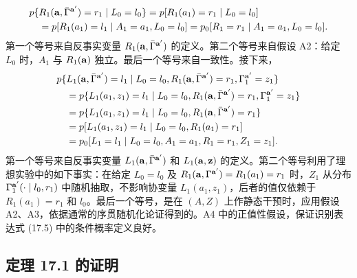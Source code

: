 \[
\begin{aligned}
&p\{R_1(\mathbf a,\bar\Gamma^{\mathbf a'})=r_1\mid L_0=l_0\}
 =p[R_1(a_1)=r_1\mid L_0=l_0]\\
&\quad=p[R_1(a_1)=l_1\mid A_1=a_1,L_0=l_0]
 =p_0[R_1=r_1\mid A_1=a_1,L_0=l_0].
\end{aligned}
\]
第一个等号来自反事实变量 $R_1(\mathbf a,\bar\Gamma^{\mathbf a'})$ 的定义。第二个等号来自假设 A2：给定 $L_0$ 时，$A_1$ 与 $R_1(\mathbf a)$ 独立。最后一个等号来自一致性。接下来，
\[
\begin{aligned}
&p\{L_1(\mathbf a,\bar\Gamma^{\mathbf a'})=l_1\mid
 L_0=l_0,R_1(\mathbf a,\bar\Gamma^{\mathbf a'})=r_1,\Gamma_1^{\mathbf a'}=z_1\}\\
&\quad=p\{L_1(a_1,z_1)=l_1\mid
 L_0=l_0,R_1(\mathbf a,\bar\Gamma^{\mathbf a'})=r_1,\Gamma_1^{\mathbf a'}=z_1\}\\
&\quad=p\{L_1(a_1,z_1)=l_1\mid L_0=l_0,R_1(\mathbf a,\bar\Gamma^{\mathbf a'})=r_1\}\\
&\quad=p[L_1(a_1,z_1)=l_1\mid L_0=l_0,R_1(a_1)=r_1]\\
&\quad=p_0[L_1=l_1\mid L_0=l_0,A_1=a_1,R_1=r_1,Z_1=z_1].
\end{aligned}
\]
第一个等号来自反事实变量 $L_1(\mathbf a,\bar\Gamma^{\mathbf a'})$ 和 $L_1(\mathbf a,\mathbf z)$ 的定义。第二个等号利用了理想实验中的如下事实：在给定 $L_0=l_0$ 及 $R_1(\mathbf a,\Gamma^{\mathbf a'})=R_1(a_1)=r_1$ 时，$Z_1$ 从分布 $\Gamma_1^{\mathbf a'}(\cdot\mid l_0,r_1)$ 中随机抽取，不影响协变量 $L_1(a_1,z_1)$，后者的值仅依赖于 $R_1(a_1)=r_1$ 和 $l_0$。最后一个等号，是在 $(A,Z)$ 上作静态干预时，应用假设 A2、A3，依据通常的序贯随机化论证得到的。A4 中的正值性假设，保证识别表达式 (17.5) 中的条件概率定义良好。

\subsection{定理 17.1 的证明}

